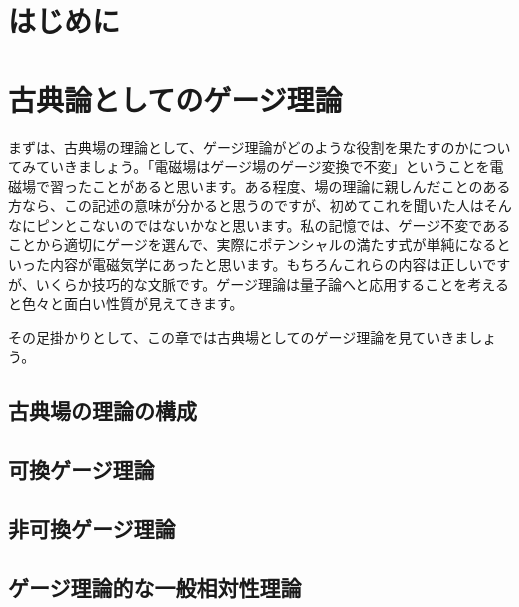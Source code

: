 \documentclass[unicode,a4paper,10pt]{ltjsarticle}
\begin{document}
\maketitle
\tableofcontents

\clearpage
\section{はじめに}




\clearpage
\section{古典論としてのゲージ理論}

まずは、古典場の理論として、ゲージ理論がどのような役割を果たすのかについてみていきましょう。「電磁場はゲージ場のゲージ変換で不変」ということを電磁場で習ったことがあると思います。ある程度、場の理論に親しんだことのある方なら、この記述の意味が分かると思うのですが、初めてこれを聞いた人はそんなにピンとこないのではないかなと思います。私の記憶では、ゲージ不変であることから適切にゲージを選んで、実際にポテンシャルの満たす式が単純になるといった内容が電磁気学にあったと思います。もちろんこれらの内容は正しいですが、いくらか技巧的な文脈です。ゲージ理論は量子論へと応用することを考えると色々と面白い性質が見えてきます。

その足掛かりとして、この章では古典場としてのゲージ理論を見ていきましょう。

\subsection{古典場の理論の構成}




\clearpage

\subsection{可換ゲージ理論}


\clearpage

\subsection{非可換ゲージ理論}


\clearpage

\subsection{ゲージ理論的な一般相対性理論}
\end{document}
